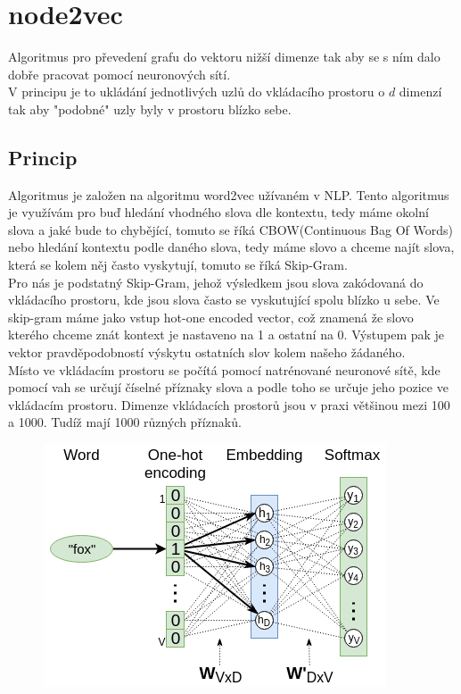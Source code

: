 \section{node2vec}
Algoritmus pro převedení grafu do vektoru nižší dimenze tak aby se s ním dalo dobře pracovat pomocí neuronových sítí.\\
V principu je to ukládání jednotlivých uzlů do vkládacího prostoru o \(d\) dimenzí tak aby "podobné" uzly byly v prostoru blízko sebe.\\

\subsection{Princip}
Algoritmus je založen na algoritmu word2vec užívaném v NLP. Tento algoritmus je využívám pro buď hledání vhodného slova dle kontextu, tedy máme okolní slova a 
jaké bude to chybějící, tomuto se říká CBOW(Continuous Bag Of Words) nebo hledání kontextu podle daného slova, tedy máme slovo a chceme najít slova, která se 
kolem něj často vyskytují, tomuto se říká Skip-Gram.\\
Pro nás je podstatný Skip-Gram, jehož výsledkem jsou slova zakódovaná do vkládacího prostoru, kde jsou slova často se vyskutující spolu blízko u sebe. Ve
skip-gram máme jako vstup hot-one encoded vector, což znamená že slovo kterého chceme znát kontext je nastaveno na 1 a ostatní na 0. Výstupem pak je vektor 
pravděpodobností výskytu ostatních slov kolem našeho žádaného.\\
Místo ve vkládacím prostoru se počítá pomocí natrénované neuronové sítě, kde pomocí vah se určují číselné příznaky slova a podle toho se určuje jeho pozice
ve vkládacím prostoru. Dimenze vkládacích prostorů jsou v praxi většinou mezi 100 a 1000. Tudíž mají 1000 různých příznaků.\\

\begin{figure}[ht]
    \centering
    \includegraphics[scale=0.7]{images/skip-gram.png}
\end{figure}

